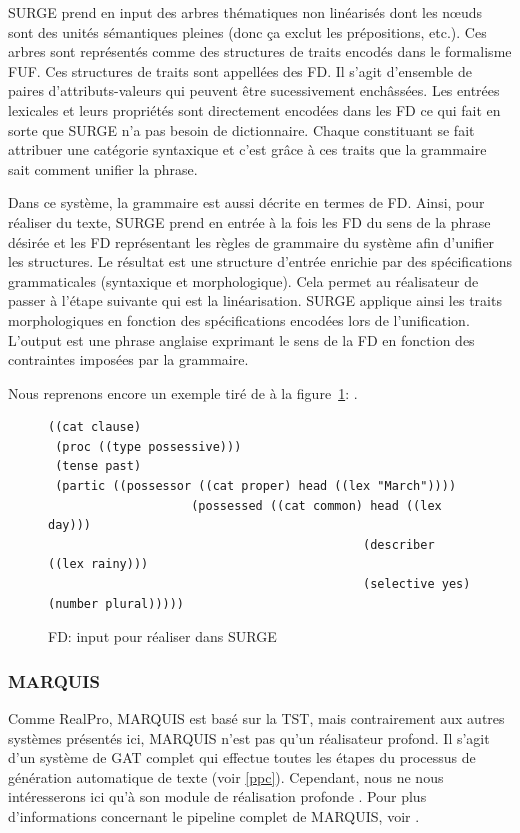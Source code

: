 SURGE prend en input des arbres thématiques non linéarisés dont les n\oe{}uds sont des unités sémantiques pleines (donc ça exclut les prépositions, etc.). Ces arbres sont représentés comme des structures de traits encodés dans le formalisme \ac{FUF}. Ces structures de traits sont appellées des \ac{FD}. Il s'agit d'ensemble de paires d'attributs-valeurs qui peuvent être sucessivement enchâssées. Les entrées lexicales et leurs propriétés sont directement encodées dans les \ac{FD} ce qui fait en sorte que SURGE n'a pas besoin de dictionnaire. Chaque constituant se fait attribuer une catégorie syntaxique et c'est grâce à ces traits que la grammaire sait comment unifier la phrase.

Dans ce système, la grammaire est aussi décrite en termes de \ac{FD}. Ainsi, pour réaliser du texte, SURGE prend en entrée à la fois les \ac{FD} du sens de la phrase désirée et les \ac{FD} représentant les règles de grammaire du système afin d'unifier les structures. Le résultat est une structure d'entrée enrichie par des spécifications grammaticales (syntaxique et morphologique). Cela permet au réalisateur de passer à l'étape suivante qui est la linéarisation. SURGE applique ainsi les traits morphologiques en fonction des spécifications encodées lors de l'unification. L'output est une phrase anglaise exprimant le sens de la \ac{FD} en fonction des contraintes imposées par la grammaire.

Nous reprenons encore un exemple tiré de \cite{ReiterBuildingNaturalLanguage2000} à la figure~\ref{surge}: .

\begin{figure}[htb]
\begin{lstlisting}[language=mate]
((cat clause)
 (proc ((type possessive)))
 (tense past)
 (partic ((possessor ((cat proper) head ((lex "March"))))
					(possessed ((cat common) head ((lex day)))
											(describer ((lex rainy)))
											(selective yes) (number plural)))))
\end{lstlisting}
 \caption{FD: input pour réaliser  dans SURGE}
 \label{surge}
\end{figure}

\subsubsection{MARQUIS}\label{sectionmarquis}
Comme RealPro, MARQUIS est basé sur la \ac{TST}, mais contrairement aux autres systèmes présentés ici, MARQUIS n'est pas qu'un réalisateur profond. Il s'agit d'un système de \ac{GAT} complet qui effectue toutes les étapes du processus de génération automatique de texte (voir \ref{ppc}). Cependant, nous ne nous intéresserons ici qu'à son module de réalisation profonde \citep{Lareau2007TowardsAG}. Pour plus d'informations concernant le pipeline complet de MARQUIS, voir \citep{WannerMARQUISGENERATIONUSERTAILORED2010,bohnet07}. 

